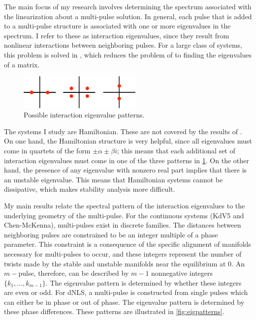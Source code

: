 \documentclass[12pt,reqno,oneside]{article}
\theoremstyle{definition}
\theoremstyle{remark}
\begin{document}
The main focus of my research involves determining the spectrum associated with the linearization about a multi-pulse solution. In general, each pulse that is added to a multi-pulse structure is associated with one or more eigenvalues in the spectrum. I refer to these as interaction eigenvalues, since they result from nonlinear interactions between neighboring pulses. For a large class of systems, this problem is solved in \cite{Sandstede1998}, which reduces the problem of to finding the eigenvalues of a matrix.

\begin{figure}
\includegraphics[width=6cm]{images/inteigpattern.eps}
\caption{Possible interaction eigenvalue patterns.} 
\label{fig:inteigpattern}
\end{figure}
The systems I study are Hamiltonian. These are not covered by the results of \cite{Sandstede1998}. On one hand, the Hamiltonian structure is very helpful, since all eigenvalues must come in quartets of the form $\pm \alpha \pm \beta i$; this means that each additional set of interaction eigenvalues must come in one of the three patterns in \cref{fig:inteigpattern}. On the other hand, the presence of any eigenvalue with nonzero real part implies that there is an unstable eigenvalue. This means that Hamiltonian systems cannot be dissipative, which makes stability analysis more difficult. 

My main results relate the spectral pattern of the interaction eigenvalues to the underlying geometry of the multi-pulse. For the continuous systems (KdV5 and Chen-McKenna), multi-pulses exist in discrete families. The distances between neighboring pulses are constrained to be an integer multiple of a phase parameter. This constraint is a consequence of the specific alignment of manifolds necessary for multi-pulses to occur, and these integers represent the number of twists made by the stable and unstable manifolds near the equilibrium at 0. An $m-$pulse, therefore, can be described by $m-1$ nonnegative integers $\{ k_1, \dots, k_{m-1} \}$. The eigenvalue pattern is determined by whether these integers are even or odd. For dNLS, a multi-pulse is constructed from single pulses which can either be in phase or out of phase. The eigenvalue pattern is determined by these phase differences. These patterns are illustrated in \cref{fig:eigpatterns}.
\end{document}
